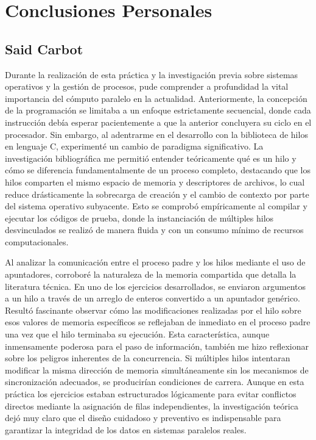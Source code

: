 \documentclass[11pt,a4paper]{article}
\begin{document}
\section*{Conclusiones Personales}
\subsection{Said Carbot }
Durante la realización de esta práctica y la investigación previa sobre sistemas operativos y la gestión de procesos, pude comprender a profundidad la vital importancia del cómputo paralelo en la actualidad. Anteriormente, la concepción de la programación se limitaba a un enfoque estrictamente secuencial, donde cada instrucción debía esperar pacientemente a que la anterior concluyera su ciclo en el procesador. Sin embargo, al adentrarme en el desarrollo con la biblioteca de hilos en lenguaje C, experimenté un cambio de paradigma significativo. La investigación bibliográfica me permitió entender teóricamente qué es un hilo y cómo se diferencia fundamentalmente de un proceso completo, destacando que los hilos comparten el mismo espacio de memoria y descriptores de archivos, lo cual reduce drásticamente la sobrecarga de creación y el cambio de contexto por parte del sistema operativo subyacente. Esto se comprobó empíricamente al compilar y ejecutar los códigos de prueba, donde la instanciación de múltiples hilos desvinculados se realizó de manera fluida y con un consumo mínimo de recursos computacionales.

Al analizar la comunicación entre el proceso padre y los hilos mediante el uso de apuntadores, corroboré la naturaleza de la memoria compartida que detalla la literatura técnica. En uno de los ejercicios desarrollados, se enviaron argumentos a un hilo a través de un arreglo de enteros convertido a un apuntador genérico. Resultó fascinante observar cómo las modificaciones realizadas por el hilo sobre esos valores de memoria específicos se reflejaban de inmediato en el proceso padre una vez que el hilo terminaba su ejecución. Esta característica, aunque inmensamente poderosa para el paso de información, también me hizo reflexionar sobre los peligros inherentes de la concurrencia. Si múltiples hilos intentaran modificar la misma dirección de memoria simultáneamente sin los mecanismos de sincronización adecuados, se producirían condiciones de carrera. Aunque en esta práctica los ejercicios estaban estructurados lógicamente para evitar conflictos directos mediante la asignación de filas independientes, la investigación teórica dejó muy claro que el diseño cuidadoso y preventivo es indispensable para garantizar la integridad de los datos en sistemas paralelos reales.
\end{document}
